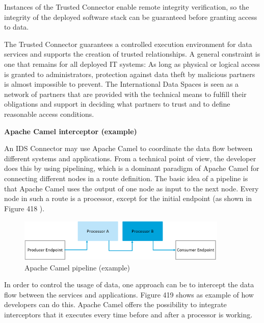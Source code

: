 Instances of the Trusted Connector enable remote integrity verification, so the integrity of the deployed software stack can be guaranteed before granting access to data.

The Trusted Connector guarantees a controlled execution environment for data services and supports the creation of trusted relationships. A general constraint is one that remains for all deployed IT systems: As long as physical or logical access is granted to administrators, protection against data theft by malicious partners is almost impossible to prevent. The International Data Spaces is seen as a network of partners that are provided with the technical means to fulfill their obligations and support in deciding what partners to trust and to define reasonable access conditions.


\textbf{Apache Camel interceptor (example)\\}

An IDS Connector may use Apache Camel to coordinate the data flow between different systems and applications. From a technical point of view, the developer does this by using pipelining, which is a dominant paradigm of Apache Camel for connecting different nodes in a route definition. The basic idea of a pipeline is that Apache Camel uses the output of one node as input to the next node. Every node in such a route is a processor, except for the initial endpoint (as shown in  Figure 418 ). 




\begin{figure}[H]
	\begin{Center}
		\includegraphics[width=3.94in,height=0.81in]{./media/image74.png}
		\caption{Apache Camel pipeline (example)}
		\label{fig:Apache_Camel_pipeline}
	\end{Center}
\end{figure}



In order to control the usage of data, one approach can be to intercept the data flow between the services and applications. Figure 419 shows as example of how developers can do this. Apache Camel offers the possibility to integrate interceptors that it executes every time before and after a processor is working.




